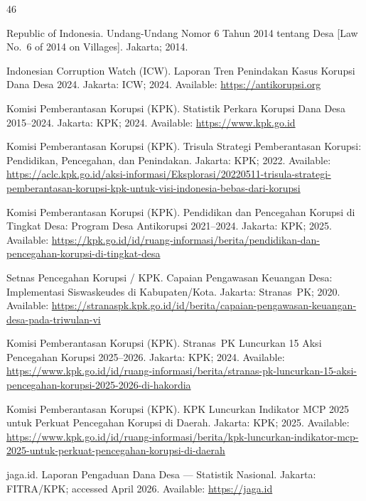 \documentclass[3p,times,procedia]{elsarticle}
\begin{document}
\begin{thebibliography}{46}


Republic of Indonesia. Undang-Undang Nomor 6 Tahun 2014 tentang Desa [Law No.~6 of 2014 on Villages]. Jakarta; 2014.

Indonesian Corruption Watch (ICW). Laporan Tren Penindakan Kasus Korupsi Dana Desa 2024. Jakarta: ICW; 2024. Available: \url{https://antikorupsi.org}

Komisi Pemberantasan Korupsi (KPK). Statistik Perkara Korupsi Dana Desa 2015--2024. Jakarta: KPK; 2024. Available: \url{https://www.kpk.go.id}

Komisi Pemberantasan Korupsi (KPK). Trisula Strategi Pemberantasan Korupsi: Pendidikan, Pencegahan, dan Penindakan. Jakarta: KPK; 2022. Available: \url{https://aclc.kpk.go.id/aksi-informasi/Eksplorasi/20220511-trisula-strategi-pemberantasan-korupsi-kpk-untuk-visi-indonesia-bebas-dari-korupsi}

Komisi Pemberantasan Korupsi (KPK). Pendidikan dan Pencegahan Korupsi di Tingkat Desa: Program Desa Antikorupsi 2021--2024. Jakarta: KPK; 2025. Available: \url{https://kpk.go.id/id/ruang-informasi/berita/pendidikan-dan-pencegahan-korupsi-di-tingkat-desa}

Setnas Pencegahan Korupsi / KPK. Capaian Pengawasan Keuangan Desa: Implementasi Siswaskeudes di Kabupaten/Kota. Jakarta: Stranas~PK; 2020. Available: \url{https://stranaspk.kpk.go.id/id/berita/capaian-pengawasan-keuangan-desa-pada-triwulan-vi}

Komisi Pemberantasan Korupsi (KPK). Stranas~PK Luncurkan 15 Aksi Pencegahan Korupsi 2025--2026. Jakarta: KPK; 2024. Available: \url{https://www.kpk.go.id/id/ruang-informasi/berita/stranas-pk-luncurkan-15-aksi-pencegahan-korupsi-2025-2026-di-hakordia}

Komisi Pemberantasan Korupsi (KPK). KPK Luncurkan Indikator MCP 2025 untuk Perkuat Pencegahan Korupsi di Daerah. Jakarta: KPK; 2025. Available: \url{https://www.kpk.go.id/id/ruang-informasi/berita/kpk-luncurkan-indikator-mcp-2025-untuk-perkuat-pencegahan-korupsi-di-daerah}

jaga.id. Laporan Pengaduan Dana Desa --- Statistik Nasional. Jakarta: FITRA/KPK; accessed April 2026. Available: \url{https://jaga.id}


\end{thebibliography}
\end{document}
